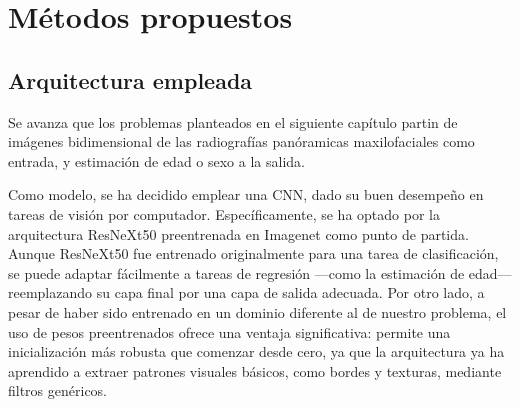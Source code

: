




\section{Métodos propuestos}

\subsection{Arquitectura empleada}

Se avanza que los problemas planteados en el siguiente capítulo partin de imágenes bidimensional de las radiografías panóramicas maxilofaciales como entrada, y estimación de edad o sexo a la salida.

Como modelo, se ha decidido emplear una CNN, dado su buen desempeño en tareas de visión por computador. Específicamente, se ha optado por la arquitectura ResNeXt50 \cite{xie2017} preentrenada en Imagenet \cite{deng2009} como punto de partida. Aunque ResNeXt50 fue entrenado originalmente para una tarea de clasificación, se puede adaptar fácilmente a tareas de regresión ---como la estimación de edad--- reemplazando su capa final por una capa de salida adecuada. Por otro lado, a pesar de haber sido entrenado en un dominio diferente al de nuestro problema, el uso de pesos preentrenados ofrece una ventaja significativa: permite una inicialización más robusta que comenzar desde cero, ya que la arquitectura ya ha aprendido a extraer patrones visuales básicos, como bordes y texturas, mediante filtros genéricos.

